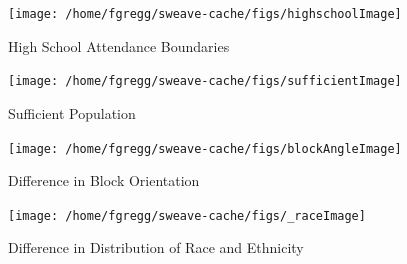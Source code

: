 \documentclass[12pt,letter]{article}\usepackage[]{graphicx}\usepackage[]{color}
\newenvironment{knitrout}{}{} %
\begin{document}
\begin{figure}
\begin{knitrout}
\color{fgcolor}

{\centering \texttt{[image: /home/fgregg/sweave-cache/figs/highschoolImage]} 

}



\end{knitrout}

\caption{High School Attendance Boundaries}
\end{figure}

\begin{figure}
\begin{knitrout}
\color{fgcolor}

{\centering \texttt{[image: /home/fgregg/sweave-cache/figs/sufficientImage]} 

}



\end{knitrout}

\caption{Sufficient Population}
\end{figure}


\begin{figure}
\begin{knitrout}
\color{fgcolor}

{\centering \texttt{[image: /home/fgregg/sweave-cache/figs/blockAngleImage]} 

}



\end{knitrout}

\caption{Difference in Block Orientation}
\end{figure}

\begin{figure}
\begin{knitrout}
\color{fgcolor}

{\centering \texttt{[image: /home/fgregg/sweave-cache/figs/\_raceImage]} 

}



\end{knitrout}

\caption{Difference in Distribution of Race and Ethnicity}
\end{figure}
\end{document}
